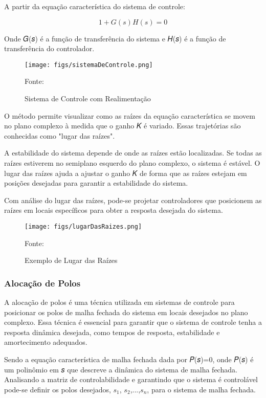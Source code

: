 A partir da equação característica do sistema de controle:

\begin{equation}
	1+𝐺(𝑠)𝐻(𝑠)=0
\end{equation}

Onde 𝐺(𝑠) é a função de transferência do sistema e 𝐻(𝑠) é a função de transferência do controlador.

\begin{figure}[htpb]
	\centering
	\texttt{[image: figs/sistemaDeControle.png]}
	\caption{Sistema de Controle com Realimentação}
	{Fonte: \cite[p.~247]{ogata2011engenharia}}
	\label{fig:15}
\end{figure}

O método permite visualizar como as raízes da equação característica se movem no plano complexo à medida que o ganho 𝐾 é variado. Essas trajetórias são conhecidas como "lugar das raízes".

A estabilidade do sistema depende de onde as raízes estão localizadas. Se todas as raízes estiverem no semiplano esquerdo do plano complexo, o sistema é estável. O lugar das raízes ajuda a ajustar o ganho 𝐾 de forma que as raízes estejam em posições desejadas para garantir a estabilidade do sistema.

Com análise do lugar das raízes, pode-se projetar controladores que posicionem as raízes em locais específicos para obter a resposta desejada do sistema.

\begin{figure}[htpb]
	\centering
	\texttt{[image: figs/lugarDasRaizes.png]}
	\caption{Exemplo de Lugar das Raízes}
	{Fonte: \cite[p.~264]{ogata2011engenharia}}
	\label{fig:15}
\end{figure}
	
\subsubsection{Alocação de Polos}

A alocação de polos é uma técnica utilizada em sistemas de controle para posicionar os polos de malha fechada do sistema em locais desejados no plano complexo. Essa técnica é essencial para garantir que o sistema de controle tenha a resposta dinâmica desejada, como tempos de resposta, estabilidade e amortecimento adequados.

Sendo a equação característica de malha fechada dada por 𝑃(𝑠)=0, onde 𝑃(𝑠) é um polinômio em 𝑠 que descreve a dinâmica do sistema de malha fechada. Analisando a matriz de controlabilidade e garantindo que o sistema é controlável pode-se definir os polos desejados, $𝑠_1$, $𝑠_2$,...,$𝑠_n$, para o sistema de malha fechada.

